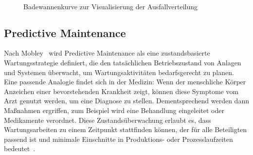 \begin{figure}[H]
    \centering
    \caption{Badewannenkurve zur Visualisierung der Ausfallverteilung}
~\label{fig:bathtub}
\end{figure}

\subsection{Predictive Maintenance}
Nach Mobley~\Cite[S.~4]{Mobley2002} wird Predictive Maintenance als eine zustandsbasierte Wartungsstrategie definiert, die den
tatsächlichen Betriebszustand von Anlagen und Systemen überwacht, um Wartungsaktivitäten bedarfsgerecht zu planen.
Eine passende Analogie findet sich in der Medizin: Wenn der menschliche Körper Anzeichen einer bevorstehenden Krankheit zeigt, können
diese Symptome vom Arzt genutzt werden, um eine Diagnose zu stellen. Dementsprechend werden dann Maßnahmen ergriffen, zum Beispiel
wird eine Behandlung eingeleitet oder Medikamente verordnet. Diese Zustandsüberwachung erlaubt es, dass Wartungsarbeiten zu einem
Zeitpunkt stattfinden können, der für alle Beteiligten passend ist und minimale Einschnitte in Produktions- oder Prozesslaufzeiten
bedeutet~\cite[S.~3]{Scheffer2004}.

